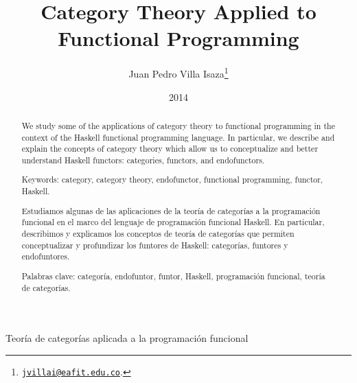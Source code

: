 \documentclass[11pt,letterpaper]{article}
\theoremstyle{definition}
\begin{document}
\title{Category Theory Applied to Functional Programming}

\author{Juan Pedro Villa Isaza\thanks{
    \href{mailto:jvillai@eafit.edu.co}{\nolinkurl{jvillai@eafit.edu.co}}.}}

\date{2014}

\maketitle

\begin{abstract}

  We study some of the applications of category theory to functional
  programming in the context of the Haskell functional programming
  language. In particular, we describe and explain the concepts of
  category theory which allow us to conceptualize and better
  understand Haskell functors: categories, functors, and endofunctors.

  \vspace{1em}
  \noindent
  Keywords: category, category theory, endofunctor, functional
  programming, functor, Haskell.

\end{abstract}

\begin{spanish}

  \begin{center}

    {\LARGE Teoría de categorías aplicada a la programación funcional}

  \end{center}

  \begin{abstract}

    Estudiamos algunas de las aplicaciones de la teoría de categorías
    a la programación funcional en el marco del lenguaje de
    programación funcional Haskell. En particular, describimos y
    explicamos los conceptos de teoría de categorías que permiten
    conceptualizar y profundizar los funtores de Haskell: categorías,
    funtores y endofuntores.

    \vspace{1em}
    \noindent
    Palabras clave: categoría, endofuntor, funtor, Haskell,
    programación funcional, teoría de categorías.

  \end{abstract}

\end{spanish}
\end{document}
